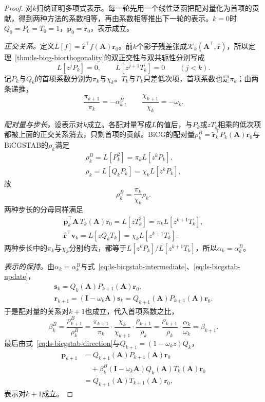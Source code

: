 \begin{proof}
对$k$归纳证明多项式表示。每一轮先用一个线性泛函把配对量化为首项的贡献，得到两种方法的系数相等，再由系数相等推出下一轮的表示。$k=0$时$Q_0=P_0=T_0=1$，$\bm p_0=\bm r_0$，表示成立。

\emph{正交关系。}定义$L[f]=\widehat{\bm r}^\top f(\bm A)\bm r_0$。前$k$个影子残差张成$\mathcal K_k(\bm A^\top,\widehat{\bm r})$，所以定理~\ref{thm:ls-bicg-biorthogonality}的双正交性与双共轭性分别写成
\[
 L[z^jP_k]=0,\qquad L[z^{j+1}T_k]=0\qquad(j<k).
\]
记$P_k$与$Q_k$的首项系数分别为$\pi_k$与$\chi_k$。$T_k$与$P_k$只差低次项，首项系数也是$\pi_k$；由两条递推，
\[
 \frac{\pi_{k+1}}{\pi_k}=-\alpha_k^{B},\qquad \frac{\chi_{k+1}}{\chi_k}=-\omega_k .
\]

\emph{配对量与步长。}设表示对$k$成立。各配对量写成$L$的值后，与$P_k$或$zT_k$相乘的低次项都被上面的正交关系消去，只剩首项的贡献。BiCG的配对量$\rho_k^{B}=\widetilde{\bm r}_k^\top P_k(\bm A)\bm r_0$与BiCGSTAB的$\rho_k$满足
\[
 \begin{gathered}
 \rho_k^{B}=L[P_k^2]=\pi_kL[z^kP_k],\\
 \rho_k=L[Q_kP_k]=\chi_kL[z^kP_k],
 \end{gathered}
\]
故
\[
 \rho_k^{B}=\frac{\pi_k}{\chi_k}\rho_k .
\]
两种步长的分母同样满足
\[
 \begin{gathered}
 \widetilde{\bm p}_k^\top\bm A\,T_k(\bm A)\bm r_0=L[zT_k^2]=\pi_kL[z^{k+1}T_k],\\
 \widehat{\bm r}^\top\bm v_k=L[zQ_kT_k]=\chi_kL[z^{k+1}T_k].
 \end{gathered}
\]
两种步长中的$\pi_k$与$\chi_k$分别约去，都等于$L[z^kP_k]/L[z^{k+1}T_k]$，所以$\alpha_k=\alpha_k^{B}$。

\emph{表示的保持。}由$\alpha_k=\alpha_k^{B}$与式~\eqref{eq:ls-bicgstab-intermediate}、\eqref{eq:ls-bicgstab-update}，
\[
 \begin{gathered}
 \bm s_k=Q_k(\bm A)P_{k+1}(\bm A)\bm r_0,\\
 \bm r_{k+1}=(\bm I-\omega_k\bm A)\bm s_k=Q_{k+1}(\bm A)P_{k+1}(\bm A)\bm r_0 .
 \end{gathered}
\]
于是配对量的关系对$k+1$也成立，代入首项系数之比，
\[
 \beta_k^{B}=\frac{\rho_{k+1}^{B}}{\rho_k^{B}}
 =\frac{\pi_{k+1}}{\pi_k}\cdot\frac{\chi_k}{\chi_{k+1}}\cdot\frac{\rho_{k+1}}{\rho_k}
 =\frac{\rho_{k+1}}{\rho_k}\cdot\frac{\alpha_k}{\omega_k}=\beta_{k+1}.
\]
最后由式~\eqref{eq:ls-bicgstab-direction}与$Q_{k+1}=(1-\omega_kz)Q_k$，
\[
 \begin{aligned}
 \bm p_{k+1}&=Q_{k+1}(\bm A)P_{k+1}(\bm A)\bm r_0\\
 &\quad+\beta_k^{B}(\bm I-\omega_k\bm A)Q_k(\bm A)T_k(\bm A)\bm r_0\\
 &=Q_{k+1}(\bm A)T_{k+1}(\bm A)\bm r_0 ,
 \end{aligned}
\]
表示对$k+1$成立。
\end{proof}

